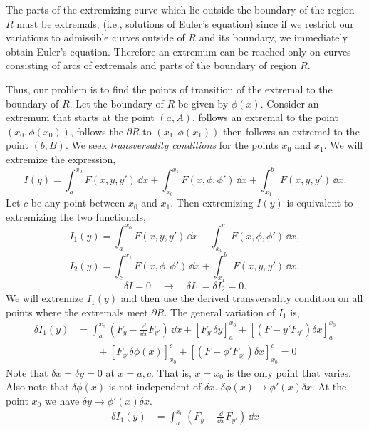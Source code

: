 \begin{Solution}
  The parts of the extremizing curve which lie outside the boundary of the
  region $R$ must be extremals, (i.e., solutions of Euler's equation) since if
  we restrict our variations to admissible curves outside of $R$ and its 
  boundary, we immediately obtain Euler's equation.  Therefore an extremum
  can be reached only on curves consisting of arcs of extremals and parts of 
  the boundary of region $R$.

  Thus, our problem is to find the points of transition of the extremal
  to the boundary of $R$.  Let the boundary of $R$ be given by $\phi(x)$.
  Consider an extremum that starts at the point $(a,A)$, follows an extremal
  to the point $(x_0,\phi(x_0))$, follows the $\partial R$ to 
  $(x_1, \phi(x_1))$ then follows an extremal to the point $(b,B)$.
  We seek \textit{transversality conditions} for the points $x_0$ and 
  $x_1$.   We will extremize the expression,
  \[
  I(y) = \int_a^{x_0} F(x,y,y') \,\dd x + \int_{x_0}^{x_1} F(x,\phi,\phi') \,\dd x 
  + \int_{x_1}^b F(x,y,y') \,\dd x.
  \]
  Let $c$ be any point between $x_0$ and $x_1$.  Then extremizing $I(y)$ is
  equivalent to extremizing the two functionals,
  \[
  I_1(y) = \int_a^{x_0} F(x,y,y') \,\dd x + \int_{x_0}^{c} F(x,\phi,\phi') \,\dd x,
  \]
  \[
  I_2(y) = \int_{c}^{x_1} F(x,\phi,\phi') \,\dd x + \int_{x_1}^b F(x,y,y') \,\dd x,
  \]
  \[
  \delta I = 0 \quad \to \quad \delta I_1 = \delta I_2 = 0.
  \]
  We will extremize $I_1(y)$ and then use the derived transversality condition
  on all points where the extremals meet $\partial R$.  The general variation
  of $I_1$ is,
  \begin{align*}
    \delta I_1(y) &=
    \int_a^{x_0} \left( F_y - \frac{\dd}{\dd x} F_{y'} \right) \,\dd x
    + \left[ F_{y'} \delta y \right]_a^{x_0}
    + \left[( F - y' F_{y'} ) \delta x \right]_a^{x_0} \\
    &\qquad + \left[ F_{\phi'} \delta \phi(x) \right]_{x_0}^c
    + \left[( F - \phi' F_{\phi'} ) \delta x \right]_{x_0}^c = 0
  \end{align*}
  Note that $\delta x = \delta y = 0$ at $x = a,c$.  That is, $x = x_0$ is 
  the only point that varies.  Also note that $\delta \phi(x)$ is not independent
  of $\delta x$.  $\delta \phi(x) \to \phi'(x) \delta x$.  At the point $x_0$
  we have $\delta y \to \phi'(x) \delta x$.
  \begin{align*}
    \delta I_1(y) &=
    \int_a^{x_0} \left( F_y - \frac{\dd}{\dd x} F_{y'} \right) \,\dd x

\end{align*}
\end{Solution}
